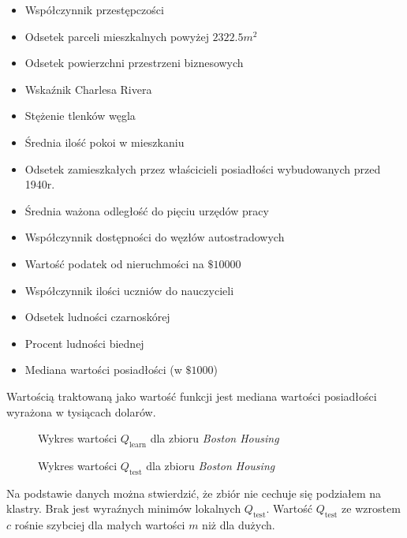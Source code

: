 \documentclass[a4paper; 11pt]{article}
\begin{document}
\begin{itemize}
\item Współczynnik przestępczości
\item Odsetek parceli mieszkalnych powyżej $2322.5m^2$
\item Odsetek powierzchni przestrzeni biznesowych
\item Wskaźnik Charlesa Rivera
\item Stężenie tlenków węgla
\item Średnia ilość pokoi w mieszkaniu
\item Odsetek zamieszkałych przez właścicieli posiadłości wybudowanych przed 1940r.
\item Średnia ważona odległość do pięciu urzędów pracy
\item Współczynnik dostępności do węzłów autostradowych
\item Wartość podatek od nieruchmości na $\$10000$
\item Współczynnik ilości uczniów do nauczycieli
\item Odsetek ludności czarnoskórej
\item Procent ludności biednej
\item Mediana wartości posiadłości (w $\$1000$)
\end{itemize}

Wartością traktowaną jako wartość funkcji jest mediana wartości posiadłości wyrażona w tysiącach dolarów.

\begin{figure}[h]
    \centering
    \begin{minipage}{0.45\textwidth}
        \centering
        \resizebox{1.2\textwidth}{!}{}
        \caption{Wykres wartości $Q_\text{learn}$ dla zbioru \emph{Boston Housing}}
        \label{fig:housing_learn}
    \end{minipage}\hfill
    \begin{minipage}{0.45\textwidth}
        \centering
        \resizebox{1.2\textwidth}{!}{}
        \caption{Wykres wartości $Q_\text{test}$ dla zbioru \emph{Boston Housing}}
        \label{fig:housing_test}
    \end{minipage}
\end{figure}

Na podstawie danych można stwierdzić, że zbiór nie cechuje się podziałem na klastry.
Brak jest wyraźnych minimów lokalnych $Q_\text{test}$.
Wartość $Q_\text{test}$ ze wzrostem $c$ rośnie szybciej dla małych wartości $m$
niż dla dużych.
\end{document}
